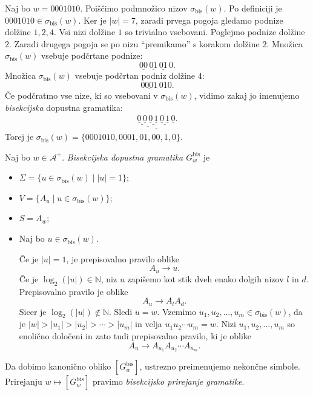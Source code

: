 \documentclass[fin1, tisk]{fmfdelo}
\providecommand{\abs}[1]{\left\lvert #1 \right\rvert}
\newcommand{\N}{\mathbb{N}}
\newcommand{\A}{\mathcal{A}}
\theoremstyle{definition}
\begin{document}
\begin{primer}\label{primer:BisČlenitev}
    Naj bo $w = 0001010$. Poiščimo podmnožico nizov $\sigma_{\text{bis}}(w)$. Po definiciji je 
    $0001010 \in \sigma_{\text{bis}}(w)$. Ker je $\abs{w} = 7$, zaradi prvega pogoja gledamo 
    podnize dolžine $1, 2, 4$. Vsi nizi dolžine $1$ so trivialno vsebovani. Poglejmo podnize 
    dolžine $2$. Zaradi drugega pogoja se po nizu ``premikamo'' s korakom dolžine $2$. Množica
     $\sigma_\text{bis}(w)$ vsebuje podčrtane podnize:
    \[
        \underline{00} \, \underline{01} \, \underline{01} \, 0.
    \]
    Množica $\sigma_\text{bis}(w)$ vsebuje podčrtan podniz dolžine $4$:
    \[
        \underline{0001} \, 010.
    \]
    Če podčratmo vse nize, ki so vsebovani v $\sigma_{\text{bis}}(w)$, vidimo zakaj jo imenujemo
    \emph{bisekcijska} dopustna gramatika:
    \begin{gather}
        \underline{\underline{\underline{\underline{0} \, \underline{0}} \,
        \underline{\underline{0} \, \underline{1}}} \, \underline{\underline{0} \, \underline{1}}
        \, \underline{0}}. \label{gather:podčratno}
    \end{gather}
    Torej je $\sigma_{\text{bis}}(w) = \{ 0001010, 0001, 01, 00, 1, 0 \}$.
\end{primer}

\begin{definicija}
    Naj bo $w \in \A^+$. \emph{Bisekcijska dopustna gramatika $G^\text{bis}_w$} je
    \begin{itemize}
        \item $\Sigma = \{ u \in \sigma_{\text{bis}}(w) \mid \abs{u} = 1 \}$;
        \item $V = \{ A_u \mid u \in \sigma_{\text{bis}}(w) \}$;
        \item $S = A_w$;
        \item Naj bo $u \in \sigma_{\text{bis}}(w)$. 
        
        Če je $\abs{u} = 1$, je prepisovalno pravilo oblike
        \[
            A_u \rightarrow u.
        \]
        Če je $\log_2(\abs{u}) \in \N$, niz $u$ zapišemo kot stik dveh enako dolgih nizov $l$ in 
        $d$. Prepisovalno pravilo je oblike
        \[
            A_u \rightarrow A_lA_d.
        \]
        Sicer je $\log_2(\abs{u}) \notin \N$. Sledi $u=w$. Vzemimo 
        $u_1, u_2, \ldots, u_m \in \sigma_{\text{bis}}(w)$, da je 
        $\abs{w} > \abs{u_1} > \abs{u_2} > \cdots > \abs{u_m}$ in velja $u_1u_2 \cdots u_m = w$.
        Nizi $u_1, u_2, \ldots, u_m$ so enolično določeni in zato tudi prepisovalno pravilo, ki
        je oblike
        \[
            A_u \rightarrow A_{u_1}A_{u_2} \cdots A_{u_m}.
        \]
    \end{itemize}
    Da dobimo kanonično obliko $[G^\text{bis}_w]$, ustrezno preimenujemo nekončne simbole.
    Prirejanju $w \mapsto [G^\text{bis}_w]$ pravimo \emph{bisekcijsko prirejanje gramatike}.
\end{definicija}
\end{document}

